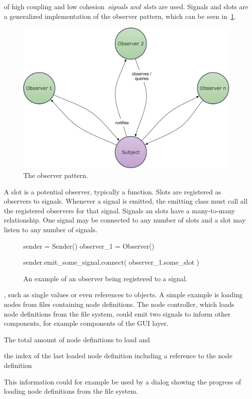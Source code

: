 \documentclass[%
    a4paper,    %
    justified,  %
    nobib,      %
    openany     %
]{tufte-book}
\begin{document}
 of high coupling and low
cohesion~\emph{signals and slots} are used. Signals and slots are a generalized
implementation of the observer pattern, which can be seen
in~\cref{fig:signals-observer-pattern}. 
\begin{figure}[ht]
  \includegraphics[width=0.8\linewidth]{images/observer-pattern}
  \caption{The observer pattern.~\cite{gamma-dpe-1995}}
  \label{fig:signals-observer-pattern}
\end{figure}

 A slot is a potential observer, typically a
function. Slots are registered as observers to signals. Whenever a signal is emitted, the
emitting class must call all the registered observers for that signal. Signals
an slots have a many-to-many relationship. One signal may be connected to any
number of slots and a slot may listen to any number of signals.

\begin{figure}
  \begin{pythoncode}
sender     = Sender()
observer_1 = Observer()

sender.emit_some_signal.connect(
    observer_1.some_slot
)
  \end{pythoncode}
  \label{lst:signal-slot}
  \caption{%
    An example of an observer being registered to a signal.
  }
\end{figure}

, such as single values or
even references to objects. A simple example is loading nodes from files
containing node definitions. The node controller, which loads node definitions
from the file system, could emit two signals to inform other components, for
example components of the GUI layer.
\begin{enumerate*}
  \item The total amount of node definitions to load and
  \item the index of the last loaded node definition including a reference to
    the node definition
\end{enumerate*}
This information could for example be used by a dialog showing the progress of
loading node definitions from the file system. 
\end{document}

